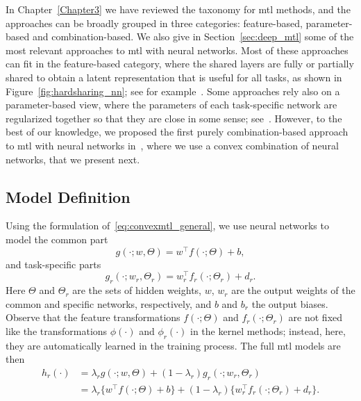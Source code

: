 %
In Chapter~\ref{Chapter3} we have reviewed the taxonomy for \acrshort{mtl} methods, and the approaches can be broadly grouped in three categories: feature-based, parameter-based and combination-based. 
We also give in Section~\ref{sec:deep_mtl} some of the most relevant approaches to \acrshort{mtl} with neural networks. Most of these approaches can fit in the feature-based category, where the shared layers are fully or partially shared to obtain a latent representation that is useful for all tasks, as shown in Figure~\ref{fig:hardsharing_nn}; see for example~\cite{Caruana97, MisraSGH16,RuderBAS17}. Some approaches rely also on a parameter-based view, where the parameters of each task-specific network are regularized together so that they are close in some sense; see~\cite{Long015a, YangH17a}.
However, to the best of our knowledge, we proposed the first purely combination-based approach to \acrshort{mtl} with neural networks in~\cite{RuizAD22_hais}, where we use a convex combination of neural networks, that we present next.



\subsection{Model Definition}
Using the formulation of~\eqref{eq:convexmtl_general}, we use neural networks to model the common part 
$$ g(\cdot; w, \Theta) = w^\intercal f(\cdot; \Theta) + b,$$
and task-specific parts
$$ g_r(\cdot; w_r, \Theta_r) =  w_r^\intercal f_r(\cdot; \Theta_r) + d_r.$$
Here $\Theta$ and $\Theta_r$ are the sets of hidden weights, $w$, $w_r$ are the output weights of the common and specific networks, respectively, and $b$ and $b_r$ the output biases.
Observe that the feature transformations $ f(\cdot; \Theta)$ and $f_r(\cdot; \Theta_r)$ are not fixed like the transformations $\phi(\cdot)$ and $\phi_r(\cdot)$ in the kernel methods; instead, here, they are automatically learned in the training process.
The full \acrshort{mtl} models are then
\begin{equation}
    \label{eq:convexmtl_nn}
    \begin{aligned}
        h_r(\cdot) &= \lambda_r g(\cdot; w, \Theta) + (1 - \lambda_r) g_r(\cdot; w_r, \Theta_r)
       \\&= \lambda_r \lbrace w^\intercal f(\cdot; \Theta) + b \rbrace + (1 - \lambda_r) \lbrace w_r^\intercal f_r(\cdot; \Theta_r) + d_r \rbrace.
    \end{aligned}    
\end{equation}

